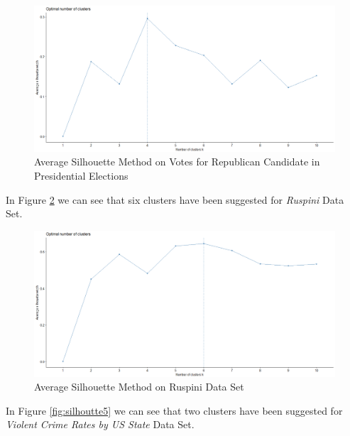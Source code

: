 \begin{itemize}
\begin{figure}[h!]
  \centering
  \includegraphics[scale=1.3]{figures/results/republican/silhouette.png}
  \caption{Average Silhouette Method on Votes for Republican Candidate in Presidential Elections}
  \label{fig:silhoutte3}
\end{figure}

\vspace{15mm}

In Figure \ref{fig:silhoutte4} we can see that six clusters have been suggested for \textit{Ruspini} Data Set.

\begin{figure}[h!]
  \centering
  \includegraphics[scale=1.3]{figures/results/ruspini/silhouette.png}
  \caption{Average Silhouette Method on Ruspini Data Set}
  \label{fig:silhoutte4}
\end{figure}

\newpage

In Figure \ref{fig:silhoutte5} we can see that two clusters have been suggested for \textit{Violent Crime Rates by US State} Data Set.


\end{itemize}
